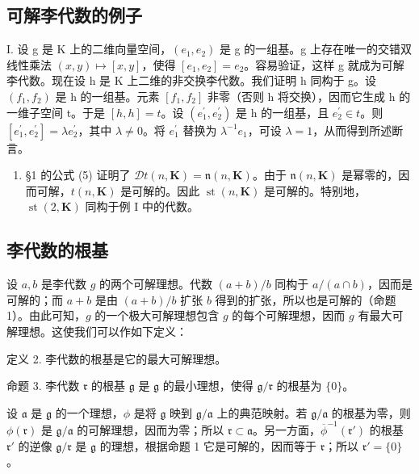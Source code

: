 \subsection*{可解李代数的例子}

I. 设 g 是 K 上的二维向量空间，\((e_{1}, e_{2})\) 是 g 的一组基。g 上存在唯一的交错双线性乘法 \((x, y) \mapsto [x, y]\)，使得 \([e_{1}, e_{2}] = e_{2}\)。容易验证，这样 g 就成为可解李代数。现在设 h 是 K 上二维的非交换李代数。我们证明 h 同构于 g。设 \((f_{1}, f_{2})\) 是 h 的一组基。元素 \([f_{1}, f_{2}]\) 非零（否则 h 将交换），因而它生成 h 的一维子空间 t。于是 \([h, h] = t\)。设 \((e_{1}^{\prime}, e_{2}^{\prime})\) 是 h 的一组基，且 \(e_{2}^{\prime} \in t\)。则 \([e_{1}^{\prime}, e_{2}^{\prime}] = \lambda e_{2}^{\prime}\)，其中 \(\lambda \neq 0\)。将 \(e_{1}^{\prime}\) 替换为 \(\lambda^{-1}e_{1}\)，可设 \(\lambda = 1\)，从而得到所述断言。

\begin{enumerate}
\def\labelenumi{\Roman{enumi}.}
\setcounter{enumi}{1}
\tightlist
\item
  §1 的公式 (5) 证明了 \(\mathcal{D}t(n, \mathbf{K}) = \mathfrak{n}(n, \mathbf{K})\)。由于 \(\mathfrak{n}(n, \mathbf{K})\) 是幂零的，因而可解，\(t(n, \mathbf{K})\) 是可解的。因此 \(\operatorname{st}(n, \mathbf{K})\) 是可解的。特别地，\(\operatorname{st}(2, \mathbf{K})\) 同构于例 I 中的代数。
\end{enumerate}

\subsection{李代数的根基}

设 \(a, b\) 是李代数 \(g\) 的两个可解理想。代数 \((a + b)/b\) 同构于 \(a/(a \cap b)\)，因而是可解的；而 \(a + b\) 是由 \((a + b)/b\) 扩张 \(b\) 得到的扩张，所以也是可解的（命题 1）。由此可知，\(g\) 的一个极大可解理想包含 \(g\) 的每个可解理想，因而 \(g\) 有最大可解理想。这使我们可以作如下定义：

定义 2. 李代数的根基是它的最大可解理想。

命题 3. 李代数 \(\mathfrak{r}\) 的根基 \(\mathfrak{g}\) 是 \(\mathfrak{g}\) 的最小理想，使得 \(\mathfrak{g} / \mathfrak{r}\) 的根基为 \(\{0\}\)。

设 \(\mathfrak{a}\) 是 \(\mathfrak{g}\) 的一个理想，\(\phi\) 是将 \(\mathfrak{g}\) 映到 \(\mathfrak{g}/\mathfrak{a}\) 上的典范映射。若 \(\mathfrak{g}/\mathfrak{a}\) 的根基为零，则 \(\phi(\mathfrak{r})\) 是 \(\mathfrak{g}/\mathfrak{a}\) 的可解理想，因而为零；所以 \(\mathfrak{r} \subset \mathfrak{a}\)。另一方面，\(\overline{\phi}^{-1}(\mathfrak{r}')\) 的根基 \(\mathfrak{r}'\) 的逆像 \(\mathfrak{g}/\mathfrak{r}\) 是 \(\mathfrak{g}\) 的理想，根据命题 1 它是可解的，因而等于 \(\mathfrak{r}\)；所以 \(\mathfrak{r}' = \{0\}\)。

